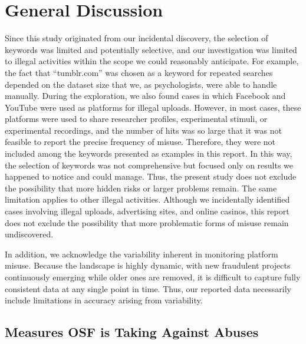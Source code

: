 \documentclass[authordate, meta]{jote-new-article}
\begin{document}
	\section{General Discussion}



	Since this study originated from our incidental discovery, the selection of keywords was limited and potentially selective, and our investigation was limited to illegal activities within the scope we could reasonably anticipate. For example, the fact that “tumblr.com” was chosen as a keyword for repeated searches depended on the dataset size that we, as psychologists, were able to handle manually. During the exploration, we also found cases in which Facebook and YouTube were used as platforms for illegal uploads. However, in most cases, these platforms were used to share researcher profiles, experimental stimuli, or experimental recordings, and the number of hits was so large that it was not feasible to report the precise frequency of misuse. Therefore, they were not included among the keywords presented as examples in this report. In this way, the selection of keywords was not comprehensive but focused only on results we happened to notice and could manage. Thus, the present study does not exclude the possibility that more hidden risks or larger problems remain. The same limitation applies to other illegal activities. Although we incidentally identified cases involving illegal uploads, advertising sites, and online casinos, this report does not exclude the possibility that more problematic forms of misuse remain undiscovered.



	In addition, we acknowledge the variability inherent in monitoring platform misuse. Because the landscape is highly dynamic, with new fraudulent projects continuously emerging while older ones are removed, it is difficult to capture fully consistent data at any single point in time. Thus, our reported data necessarily include limitations in accuracy arising from variability.







	\subsection{Measures OSF is Taking Against Abuses}
\end{document}
